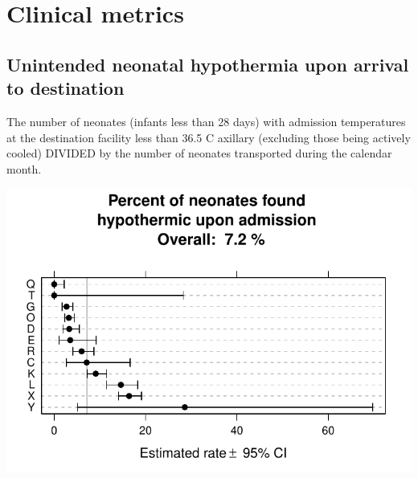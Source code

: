 \documentclass[twoside]{article}\usepackage[]{graphicx}\usepackage[]{color}
\makeatletter
\def\maxwidth{ %
  \ifdim\Gin@nat@width>\linewidth
    \linewidth
  \else
    \Gin@nat@width
  \fi
}
\newenvironment{knitrout}{}{} %
\makeatother
\begin{document}
\newpage
\section{Clinical metrics}
\subsection{Unintended neonatal hypothermia upon arrival to destination}
The number of neonates (infants less than 28 days) with admission temperatures at the destination facility less than 36.5 C axillary (excluding those being actively cooled) DIVIDED by the number of neonates transported during the calendar month.

\begin{center}
\begin{knitrout}
\color{fgcolor}
\includegraphics[width=\maxwidth]{figure/r_neonatal_hypothermia} 

\end{knitrout}

\end{center}
\end{document}
